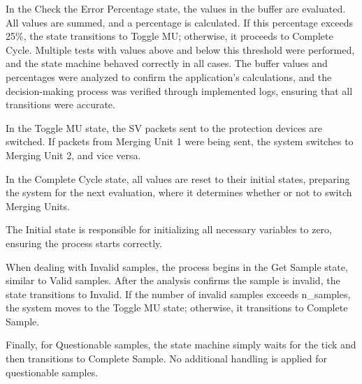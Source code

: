 In the Check the Error Percentage state, the values in the buffer are evaluated. All values are summed, and a percentage is calculated. If this percentage exceeds 25\%, the state transitions to Toggle MU; otherwise, it proceeds to Complete Cycle. Multiple tests with values above and below this threshold were performed, and the state machine behaved correctly in all cases. The buffer values and percentages were analyzed to confirm the application's calculations, and the decision-making process was verified through implemented logs, ensuring that all transitions were accurate.

In the Toggle MU state, the SV packets sent to the protection devices are switched. If packets from Merging Unit 1 were being sent, the system switches to Merging Unit 2, and vice versa.

In the Complete Cycle state, all values are reset to their initial states, preparing the system for the next evaluation, where it determines whether or not to switch Merging Units.

The Initial state is responsible for initializing all necessary variables to zero, ensuring the process starts correctly.

When dealing with Invalid samples, the process begins in the Get Sample state, similar to Valid samples. After the analysis confirms the sample is invalid, the state transitions to Invalid. If the number of invalid samples exceeds n\_samples, the system moves to the Toggle MU state; otherwise, it transitions to Complete Sample.

Finally, for Questionable samples, the state machine simply waits for the tick and then transitions to Complete Sample. No additional handling is applied for questionable samples.
